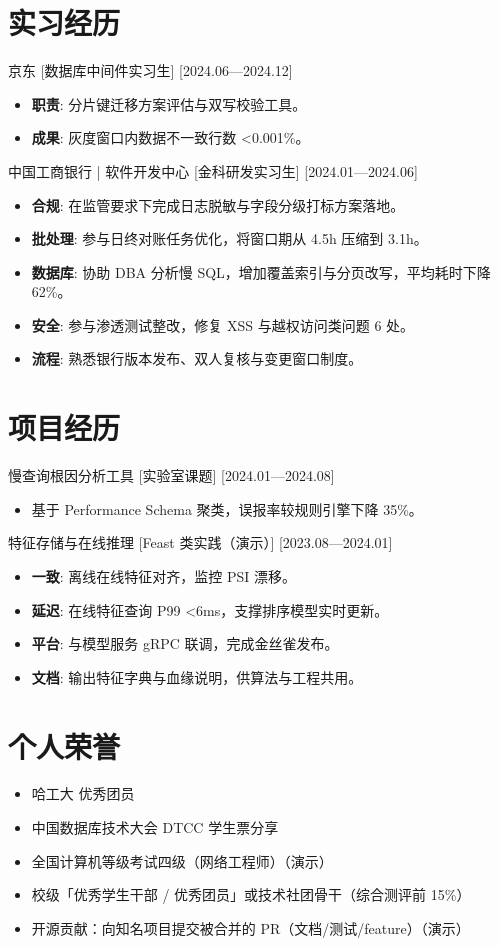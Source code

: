 \documentclass{resume-photo}
\begin{document}
\section{实习经历}
\ResumeItem
{京东}
[\textnormal{数据库中间件实习生}]
[2024.06—2024.12]

\begin{itemize}
  \item \textbf{职责}: 分片键迁移方案评估与双写校验工具。
  \item \textbf{成果}: 灰度窗口内数据不一致行数 <0.001\%。
\end{itemize}


\ResumeItem
{中国工商银行 | 软件开发中心}
[\textnormal{金科研发实习生}]
[2024.01—2024.06]

\begin{itemize}
  \item \textbf{合规}: 在监管要求下完成日志脱敏与字段分级打标方案落地。
  \item \textbf{批处理}: 参与日终对账任务优化，将窗口期从 4.5h 压缩到 3.1h。
  \item \textbf{数据库}: 协助 DBA 分析慢 SQL，增加覆盖索引与分页改写，平均耗时下降 62\%。
  \item \textbf{安全}: 参与渗透测试整改，修复 XSS 与越权访问类问题 6 处。
  \item \textbf{流程}: 熟悉银行版本发布、双人复核与变更窗口制度。
\end{itemize}



\section{项目经历}
\ResumeItem
{慢查询根因分析工具}
[\textnormal{实验室课题}]
[2024.01—2024.08]

\begin{itemize}
  \item 基于 Performance Schema 聚类，误报率较规则引擎下降 35\%。
\end{itemize}


\ResumeItem
{特征存储与在线推理}
[\textnormal{Feast 类实践（演示）}]
[2023.08—2024.01]

\begin{itemize}
  \item \textbf{一致}: 离线在线特征对齐，监控 PSI 漂移。
  \item \textbf{延迟}: 在线特征查询 P99 <6ms，支撑排序模型实时更新。
  \item \textbf{平台}: 与模型服务 gRPC 联调，完成金丝雀发布。
  \item \textbf{文档}: 输出特征字典与血缘说明，供算法与工程共用。
\end{itemize}



\section{个人荣誉}
\begin{itemize}
  \item 哈工大 优秀团员
  \item 中国数据库技术大会 DTCC 学生票分享
  \item 全国计算机等级考试四级（网络工程师）（演示）
  \item 校级「优秀学生干部 / 优秀团员」或技术社团骨干（综合测评前 15\%）
  \item 开源贡献：向知名项目提交被合并的 PR（文档/测试/feature）（演示）
\end{itemize}
\end{document}
